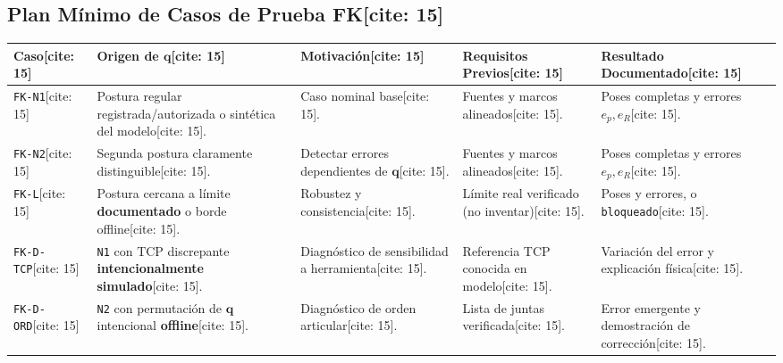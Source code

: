 \documentclass[10pt, a4paper]{article}
\begin{document}
\subsection{Plan Mínimo de Casos de Prueba FK[cite: 15]}
\noindent
{\scriptsize
\renewcommand{\arraystretch}{1.25}
\noindent\begin{tabularx}{\textwidth}{|l|>{\hsize=1.15\hsize\raggedright\arraybackslash}X|>{\hsize=0.95\hsize\raggedright\arraybackslash}X|>{\hsize=0.90\hsize\raggedright\arraybackslash}X|>{\hsize=1.00\hsize\raggedright\arraybackslash}X|}
\hline
\rowcolor{ucbblue!15}
\textbf{Caso}[cite: 15] & \textbf{Origen de $\mathbf{q}$}[cite: 15] & \textbf{Motivación}[cite: 15] & \textbf{Requisitos Previos}[cite: 15] & \textbf{Resultado Documentado}[cite: 15] \\ \hline
\texttt{FK-N1}[cite: 15] & Postura regular registrada/autorizada o sintética del modelo[cite: 15]. & Caso nominal base[cite: 15]. & Fuentes y marcos alineados[cite: 15]. & Poses completas y errores $e_p, e_R$[cite: 15]. \\ \hline
\texttt{FK-N2}[cite: 15] & Segunda postura claramente distinguible[cite: 15]. & Detectar errores dependientes de $\mathbf{q}$[cite: 15]. & Fuentes y marcos alineados[cite: 15]. & Poses completas y errores $e_p, e_R$[cite: 15]. \\ \hline
\texttt{FK-L}[cite: 15] & Postura cercana a límite \textbf{documentado} o borde offline[cite: 15]. & Robustez y consistencia[cite: 15]. & Límite real verificado (no inventar)[cite: 15]. & Poses y errores, o \texttt{bloqueado}[cite: 15]. \\ \hline
\texttt{FK-D-TCP}[cite: 15] & \texttt{N1} con TCP discrepante \textbf{intencionalmente simulado}[cite: 15]. & Diagnóstico de sensibilidad a herramienta[cite: 15]. & Referencia TCP conocida en modelo[cite: 15]. & Variación del error y explicación física[cite: 15]. \\ \hline
\texttt{FK-D-ORD}[cite: 15] & \texttt{N2} con permutación de $\mathbf{q}$ intencional \textbf{offline}[cite: 15]. & Diagnóstico de orden articular[cite: 15]. & Lista de juntas verificada[cite: 15]. & Error emergente y demostración de corrección[cite: 15]. \\ \hline
\end{tabularx}
}

\end{document}
